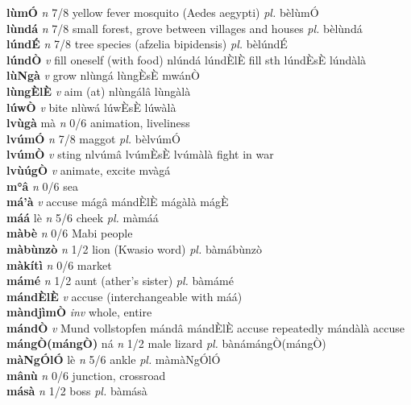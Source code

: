 \documentclass{article}
\newlength\cus
\begin{document}
{\bf lùmÓ}  {\it n} 7/8 yellow fever mosquito (Aedes aegypti) {\it pl.} bèlùmÓ         \\ 
{\bf lùndá}  {\it n} 7/8 small forest, grove between villages and houses {\it pl.} bèlùndá         \\ 
{\bf lúndÉ}  {\it n} 7/8 tree species (afzelia bipidensis) {\it pl.} bèlúndÉ         \\ 
{\bf lúndÒ}  {\it v} fill oneself (with food)   nlúndá lúndÈlÈ fill sth lúndÈsÈ lúndàlà   \\ 
{\bf lùNgà}  {\it v} grow   nlùngá  lùngÈsÈ mwánÒ    \\ 
{\bf lùngÈlÈ}  {\it v} aim (at)   nlùngálâ   lùngàlà   \\ 
{\bf lúwÒ}  {\it v     } bite   nlùwá  lúwÈsÈ lúwàlà   \\ 
{\bf lvùgà} mà {\it n} 0/6 animation, liveliness         \\ 
{\bf lvúmÓ}  {\it n} 7/8 maggot {\it pl.} bèlvúmÓ         \\ 
{\bf lvúmÒ}  {\it v} sting   nlvúmâ  lvúmÈsÈ lvúmàlà fight in war   \\ 
{\bf lvùúgÒ}  {\it v} animate, excite mvàgá        \\ 
{\bf m°â}  {\it n} 0/6 sea         \\ 
{\bf má'à}  {\it v} accuse   mágâ mándÈlÈ  mágàlà  mágÈ \\ 
{\bf máá} lè {\it n} 5/6 cheek {\it pl.} màmáá         \\ 
{\bf màbè}  {\it n} 0/6 Mabi people         \\ 
{\bf màbùnzò}  {\it n} 1/2 lion (Kwasio word) {\it pl.} bàmábùnzò         \\ 
{\bf màkítì}  {\it n} 0/6 market         \\ 
{\bf mámé}  {\it n} 1/2 aunt (ather's sister) {\it pl.} bàmámé         \\ 
{\bf mándÈlÈ}  {\it v} accuse (interchangeable with máá)         \\ 
{\bf màndjìmÒ}  {\it inv} whole, entire         \\ 
{\bf mándÒ}  {\it v} Mund vollstopfen   mándâ mándÈlÈ accuse repeatedly  mándàlà accuse   \\ 
{\bf mángÒ(mángÒ)} ná {\it n} 1/2 male lizard {\it pl.} bànámángÒ(mángÒ)         \\ 
{\bf màNgÓlÓ} lè {\it n} 5/6 ankle {\it pl.} màmàNgÓlÓ         \\ 
{\bf mânù}  {\it n} 0/6 junction, crossroad         \\ 
{\bf másà}  {\it n} 1/2 boss {\it pl.} bàmásà         \\ 
\end{document}
